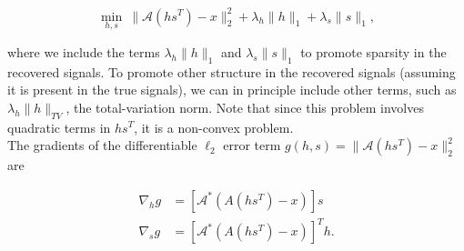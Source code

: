 \documentclass[journal]{IEEEtran}
\begin{document}
\[ \min_{h,s}~ \|\mathcal{A}(hs^T)-x\|_2^2 + \lambda_h\|h\|_1 + \lambda_s \|s\|_1, \] 

\noindent where we include the terms $\lambda_h\|h\|_1$ and $\lambda_s\|s\|_1$ to promote sparsity in the recovered signals.  To promote other structure in the recovered signals (assuming it is present in the true signals), we can in principle include other terms, such as $\lambda_h\|h\|_{TV}$, the total-variation norm.  Note that since this problem involves quadratic terms in $hs^T$, it is a non-convex problem.\\

The gradients of the differentiable $\ell_2$ error term $g(h,s)=\|\mathcal{A}(hs^T)-x\|_2^2$ are

\begin{align*}
   \nabla_h g &= \left[\mathcal{A}^\ast\left(A(hs^T) - x\right)\right]s\\
   \nabla_s g &= \left[\mathcal{A}^\ast\left(A(hs^T) - x\right)\right]^Th.
\end{align*}
\end{document}
